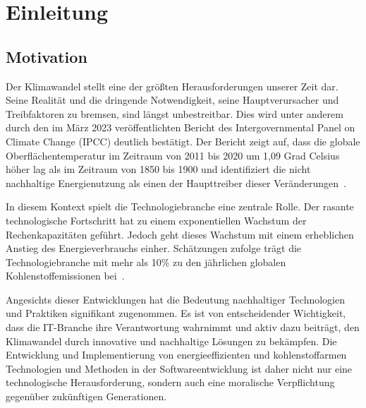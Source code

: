\chapter{Einleitung}

\section{Motivation}
Der Klimawandel stellt eine der größten Herausforderungen unserer Zeit dar.
Seine Realität und die dringende Notwendigkeit, seine Hauptverursacher und Treibfaktoren zu bremsen, sind längst unbestreitbar.
Dies wird unter anderem durch den im März 2023 veröffentlichten Bericht des Intergovernmental Panel on Climate Change (IPCC) deutlich bestätigt.
Der Bericht zeigt auf, dass die globale Oberflächentemperatur im Zeitraum von 2011 bis 2020 um 1,09 Grad Celsius höher lag als im Zeitraum von 1850 bis 1900 und identifiziert die nicht nachhaltige Energienutzung als einen der Haupttreiber dieser Veränderungen~\cite{IPCC.2023}.

In diesem Kontext spielt die Technologiebranche eine zentrale Rolle.
Der rasante technologische Fortschritt hat zu einem exponentiellen Wachstum der Rechenkapazitäten geführt.
Jedoch geht dieses Wachstum mit einem erheblichen Anstieg des Energieverbrauchs einher.
Schätzungen zufolge trägt die Technologiebranche mit mehr als 10\% zu den jährlichen globalen Kohlenstoffemissionen bei~\cite{Buchanan.2023}.

Angesichts dieser Entwicklungen hat die Bedeutung nachhaltiger Technologien und Praktiken signifikant zugenommen.
Es ist von entscheidender Wichtigkeit, dass die IT-Branche ihre Verantwortung wahrnimmt und aktiv dazu beiträgt, den Klimawandel durch innovative und nachhaltige Lösungen zu bekämpfen.
Die Entwicklung und Implementierung von energieeffizienten und kohlenstoffarmen Technologien und Methoden in der Softwareentwicklung ist daher nicht nur eine technologische Herausforderung, sondern auch eine moralische Verpflichtung gegenüber zukünftigen Generationen.

